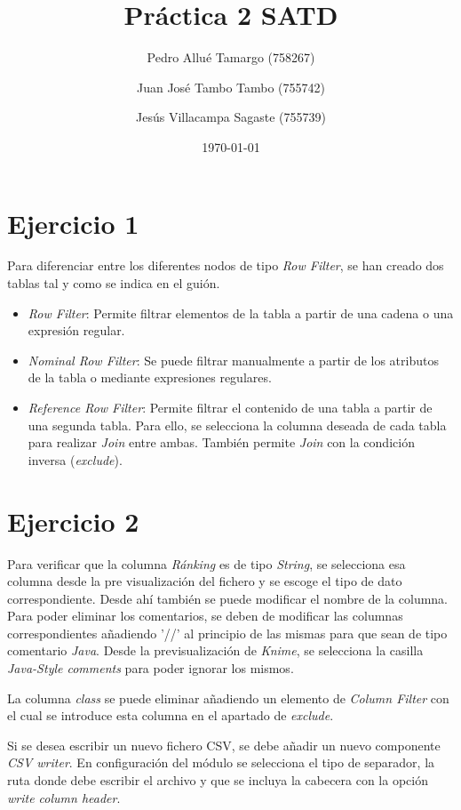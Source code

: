 \documentclass[10pt,a4paper]{article}
\begin{document}
\begin{titlepage}
\title{\textbf{{\Huge Práctica 2 SATD}}}
\author{
	Pedro Allué Tamargo (758267)
	\and
	Juan José Tambo Tambo (755742)
	\and
	Jesús Villacampa Sagaste (755739)
}
\date{\today}
\clearpage\maketitle
\thispagestyle{empty}
\tableofcontents
\end{titlepage}

\section{Ejercicio 1}

Para diferenciar entre los diferentes nodos de tipo \textit{Row Filter}, se han creado dos tablas tal y como se indica en el guión. 
\begin{itemize}
\item\textit{Row Filter}: Permite filtrar elementos de la tabla a partir de una cadena o una expresión regular.
\item\textit{Nominal Row Filter}: Se puede filtrar manualmente a partir de los atributos de la tabla o mediante expresiones regulares.
\item\textit{Reference Row Filter}: Permite filtrar el contenido de una tabla a partir de una segunda tabla. Para ello, se selecciona la columna deseada de cada tabla para realizar \textit{Join} entre ambas. También permite \textit{Join} con la condición inversa (\textit{exclude}).  
\end{itemize}

\section{Ejercicio 2}

Para verificar que la columna \textit{Ránking} es de tipo \textit{String}, se selecciona esa columna desde la  pre visualización del fichero y se escoge el tipo de dato correspondiente. Desde ahí también se puede modificar el nombre de la columna. 
Para poder eliminar los comentarios, se deben de modificar las columnas correspondientes añadiendo '//' al principio de las mismas para que sean de tipo comentario \textit{Java}. Desde la previsualización de \textit{Knime}, se selecciona la casilla \textit{Java-Style comments} para poder ignorar los mismos.\par
La columna \textit{class} se puede eliminar añadiendo un elemento de \textit{Column Filter} con el cual se introduce esta columna en el apartado de \textit{exclude}. \par
Si se desea escribir un nuevo fichero CSV, se debe añadir un nuevo componente \textit{CSV writer}. En configuración del módulo se selecciona el tipo de separador, la ruta donde debe escribir el archivo y que se incluya la cabecera con la opción \textit{write column header}.
\end{document}
